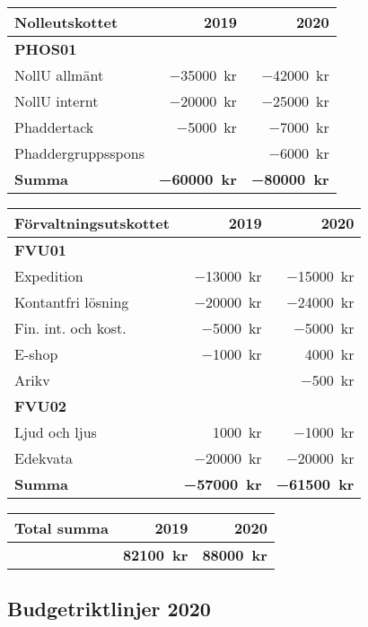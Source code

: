 \documentclass[10pt]{article}
\begin{document}
    \begin{tabularx}{10cm}{X r r}
        \textbf{\large Nolleutskottet} & \textbf{2019} & \textbf{2020} \\
        \hline
        \textbf{PHOS01} \\
        NollU allmänt & \SI{-35000}{kr} & \SI{-42000}{kr} \\
        NollU internt & \SI{-20000}{kr} & \SI{-25000}{kr} \\
        Phaddertack & \SI{-5000}{kr} & \SI{-7000}{kr} \\
        Phaddergruppsspons & & \SI{-6000}{kr} \\
        \hline
        \textbf{Summa} & \textbf{\SI{-60000}{kr}} & \textbf{\SI{-80000}{kr}} \\
    \end{tabularx}
    
    \begin{tabularx}{9cm}{X r r}
        \textbf{\large Förvaltningsutskottet} & \textbf{2019} & \textbf{2020} \\
        \hline
        \textbf{FVU01} \\
        Expedition & \SI{-13000}{kr} & \SI{-15000}{kr} \\
        Kontantfri lösning & \SI{-20000}{kr} & \SI{-24000}{kr} \\
        Fin. int. och kost. & \SI{-5000}{kr} & \SI{-5000}{kr} \\
        E-shop & \SI{-1000}{kr} & \SI{4000}{kr} \\
        Arikv & & \SI{-500}{kr} \\
        \textbf{FVU02} \\
        Ljud och ljus & \SI{1000}{kr} & \SI{-1000}{kr} \\
        Edekvata & \SI{-20000}{kr} & \SI{-20000}{kr} \\
        \hline
        \textbf{Summa} & \textbf{\SI{-57000}{kr}} & \textbf{\SI{-61500}{kr}} \\
    \end{tabularx}
    
    \begin{tabularx}{9cm}{X r r}
        \textbf{\large Total summa} & \textbf{2019} & \textbf{2020} \\
        \hline
         & \textbf{\SI{82100}{kr}} & \textbf{\SI{88000}{kr}} \\
    \end{tabularx}
    
    
    \newpage
    \subsection*{Budgetriktlinjer 2020}
    
\end{document}
